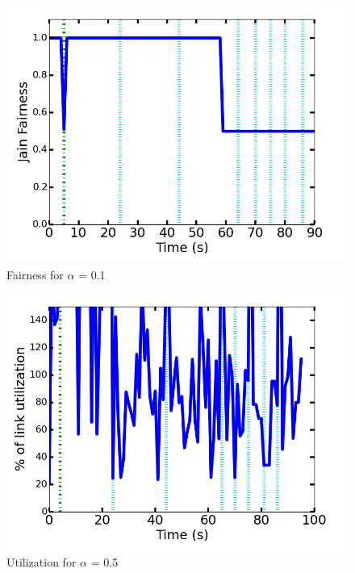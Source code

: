 \documentclass[12pt]{article}
\begin{document}
\begin{figure}
\centering
\includegraphics[scale = 0.75]{exp1/fairness.png}
\caption{Fairness for $\alpha$ = 0.1}
\end{figure}

\begin{figure}
\centering
\includegraphics[scale = 0.75]{exp2/utilization.png}
\caption{Utilization for $\alpha$ = 0.5}
\end{figure}
\end{document}
